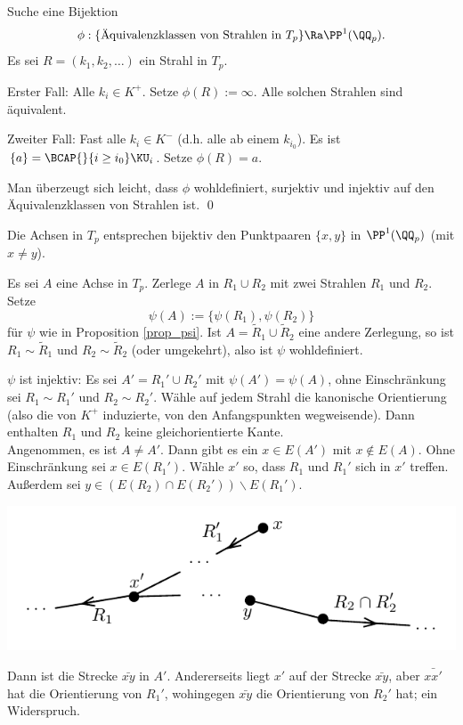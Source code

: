 \bew Suche eine Bijektion
\[
\phi:\{\text{Äquivalenzklassen von Strahlen in $T_p$}\}
\Ra \PP^1(\QQ_p).
\]
Es sei $R=(k_1,k_2,\ldots)$ ein Strahl in $T_p$.

Erster Fall: Alle $k_i\in K^+$. Setze $\phi(R):=\infty$.
Alle solchen Strahlen sind äquivalent.

Zweiter Fall: Fast alle $k_i\in K^-$ (d.h. alle ab einem $k_{i_0}$).
Es ist $\{a\}=\BCAP{}{i\geq i_0} \KU_i$.
Setze $\phi(R)=a$.

Man überzeugt sich leicht, dass $\phi$ wohldefiniert, surjektiv und
injektiv auf den Äquivalenzklassen von Strahlen ist.
\qed


\BEM
Die Achsen in $T_p$ entsprechen bijektiv den Punktpaaren
$\{x,y\}$ in $\PP^1(\QQ_p)$ (mit $x\neq y$).

\bew Es sei $A$ eine Achse in $T_p$. Zerlege $A$ in $R_1\cup R_2$
mit zwei Strahlen $R_1$ und $R_2$. Setze
\[
\psi(A) := \{\psi(R_1),\psi(R_2)\}
\]
für $\psi$ wie in Proposition \ref{prop_psi}.
Ist $A=\tilde{R}_1\cup\tilde{R}_2$ eine andere Zerlegung, so ist
$R_1\sim \tilde{R}_1$ und $R_2\sim\tilde{R}_2$ (oder umgekehrt),
also ist $\psi$ wohldefiniert.

$\psi$ ist injektiv: Es sei $A'=R_1'\cup R_2'$ mit
$\psi(A')=\psi(A)$, ohne Einschränkung sei $R_1\sim R_1'$ und
$R_2\sim R_2'$.
Wähle auf jedem Strahl die kanonische Orientierung (also die von
$K^+$ induzierte, von den Anfangspunkten wegweisende).
Dann enthalten $R_1$ und $R_2$ keine gleichorientierte Kante.\\
Angenommen, es ist $A\neq A'$. Dann gibt es ein $x\in E(A')$ mit
$x\not\in E(A)$. Ohne Einschränkung sei $x\in E(R_1')$.
Wähle $x'$ so, dass $R_1$ und $R_1'$ sich in $x'$ treffen.
Außerdem sei $y\in (E(R_2)\cap E(R_2'))\backslash E(R_1')$.
\begin{center}
	\includegraphics{grugraImages/strahlen}
\end{center}
Dann ist die Strecke $\bar{xy}$ in $A'$. Andererseits liegt $x'$
auf der Strecke $\bar{xy}$, aber $\bar{xx'}$ hat die Orientierung
von $R_1'$, wohingegen $\bar{xy}$ die Orientierung von $R_2'$ hat;
ein Widerspruch.

